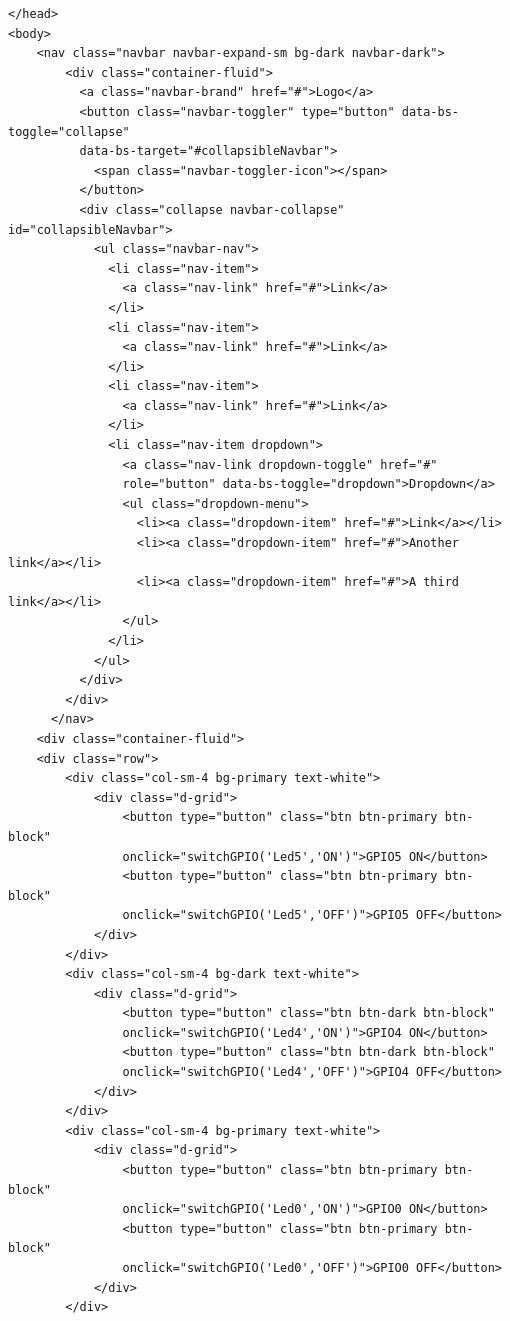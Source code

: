 \documentclass[oneside]{article}
\begin{document}
\begin{lstlisting}
</head>
<body>
    <nav class="navbar navbar-expand-sm bg-dark navbar-dark">
        <div class="container-fluid">
          <a class="navbar-brand" href="#">Logo</a>
          <button class="navbar-toggler" type="button" data-bs-toggle="collapse"
          data-bs-target="#collapsibleNavbar">
            <span class="navbar-toggler-icon"></span>
          </button>
          <div class="collapse navbar-collapse" id="collapsibleNavbar">
            <ul class="navbar-nav">
              <li class="nav-item">
                <a class="nav-link" href="#">Link</a>
              </li>
              <li class="nav-item">
                <a class="nav-link" href="#">Link</a>
              </li>
              <li class="nav-item">
                <a class="nav-link" href="#">Link</a>
              </li>  
              <li class="nav-item dropdown">
                <a class="nav-link dropdown-toggle" href="#" 
                role="button" data-bs-toggle="dropdown">Dropdown</a>
                <ul class="dropdown-menu">
                  <li><a class="dropdown-item" href="#">Link</a></li>
                  <li><a class="dropdown-item" href="#">Another link</a></li>
                  <li><a class="dropdown-item" href="#">A third link</a></li>
                </ul>
              </li>
            </ul>
          </div>
        </div>
      </nav>
    <div class="container-fluid">
    <div class="row">
        <div class="col-sm-4 bg-primary text-white">
            <div class="d-grid">
                <button type="button" class="btn btn-primary btn-block"
                onclick="switchGPIO('Led5','ON')">GPIO5 ON</button>
                <button type="button" class="btn btn-primary btn-block"
                onclick="switchGPIO('Led5','OFF')">GPIO5 OFF</button>
            </div>
        </div>
        <div class="col-sm-4 bg-dark text-white">
            <div class="d-grid">
                <button type="button" class="btn btn-dark btn-block"
                onclick="switchGPIO('Led4','ON')">GPIO4 ON</button>
                <button type="button" class="btn btn-dark btn-block"
                onclick="switchGPIO('Led4','OFF')">GPIO4 OFF</button>
            </div>
        </div>
        <div class="col-sm-4 bg-primary text-white">
            <div class="d-grid">
                <button type="button" class="btn btn-primary btn-block"
                onclick="switchGPIO('Led0','ON')">GPIO0 ON</button>
                <button type="button" class="btn btn-primary btn-block"
                onclick="switchGPIO('Led0','OFF')">GPIO0 OFF</button>
            </div>
        </div>
        

\end{lstlisting}
\end{document}
